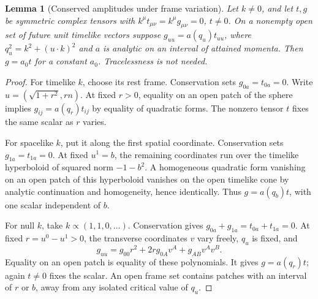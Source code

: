 \documentclass[12pt]{article}
\newtheorem{lemma}[theorem]{Lemma}
\theoremstyle{definition}
\theoremstyle{remark}
\begin{document}
\begin{lemma}[Conserved amplitudes under frame variation]\label{lem:quadric}
Let \(k\ne0\), and let \(t,g\) be symmetric complex tensors with
\(k^\mu t_{\mu\nu}=k^\mu g_{\mu\nu}=0\), \(t\ne0\).
On a nonempty open set of future unit timelike vectors suppose
\(g_{uu}=a(q_u)t_{uu}\), where \(q_u^2=k^2+(u\cdot k)^2\) and \(a\) is analytic
on an interval of attained momenta. Then \(g=a_0t\) for a constant \(a_0\).
Tracelessness is not needed.
\end{lemma}

\begin{proof}
For timelike \(k\), choose its rest frame. Conservation sets \(g_{0a}=t_{0a}=0\).
Write \(u=(\sqrt{1+r^2},rn)\). At fixed \(r>0\), equality on an open patch of
the sphere implies \(g_{ij}=a(q_r)t_{ij}\) by equality of quadratic forms.
The nonzero tensor \(t\) fixes the same scalar as \(r\) varies.

For spacelike \(k\), put it along the first spatial coordinate. Conservation sets
\(g_{1a}=t_{1a}=0\). At fixed \(u^1=b\), the remaining coordinates run over the
timelike hyperboloid of squared norm \(-1-b^2\).
A homogeneous quadratic form vanishing on an open patch of this hyperboloid vanishes
on the open timelike cone by analytic continuation and homogeneity, hence identically.
Thus \(g=a(q_b)t\), with one scalar independent of \(b\).

For null \(k\), take \(k\propto(1,1,0,\ldots)\). Conservation gives
\(g_{0a}+g_{1a}=t_{0a}+t_{1a}=0\). At fixed \(r=u^0-u^1>0\), the transverse
coordinates \(v\) vary freely, \(q_u\) is fixed, and
\[
g_{uu}=g_{00}r^2+2r g_{0A}v^A+g_{AB}v^Av^B.
\]
Equality on an open patch is equality of these polynomials. It gives \(g=a(q_r)t\);
again \(t\ne0\) fixes the scalar. An open frame set contains patches with an interval
of \(r\) or \(b\), away from any isolated critical value of \(q_u\).
\end{proof}
\end{document}
